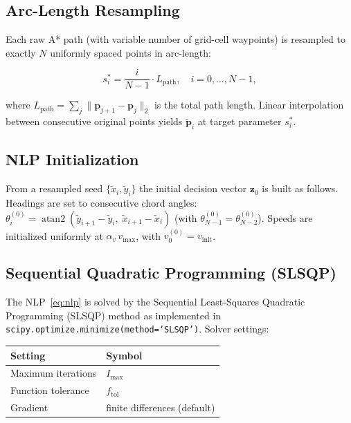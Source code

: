 \documentclass[11pt,a4paper]{article}
\begin{document}
\subsection{Arc-Length Resampling}

Each raw A* path (with variable number of grid-cell waypoints) is resampled to
exactly $N$ uniformly spaced points in arc-length:

\begin{equation}
  s_i^* = \frac{i}{N-1} \cdot L_{\mathrm{path}}, \quad i = 0, \ldots, N-1,
\end{equation}

where $L_{\mathrm{path}} = \sum_j \|\mathbf{p}_{j+1} - \mathbf{p}_j\|_2$ is
the total path length.
Linear interpolation between consecutive original points yields
$\tilde{\mathbf{p}}_i$ at target parameter $s_i^*$.

\subsection{NLP Initialization}

From a resampled seed $\{\tilde{x}_i, \tilde{y}_i\}$ the initial decision
vector $\mathbf{z}_0$ is built as follows.
Headings are set to consecutive chord angles:
$\theta_i^{(0)} = \operatorname{atan2}(\tilde{y}_{i+1} - \tilde{y}_i,\;
                                       \tilde{x}_{i+1} - \tilde{x}_i)$
(with $\theta_{N-1}^{(0)} = \theta_{N-2}^{(0)}$).
Speeds are initialized uniformly at $\alpha_v\,v_{\max}$, with
$v_0^{(0)} = v_{\mathrm{init}}$.

\subsection{Sequential Quadratic Programming (SLSQP)}

The NLP~\eqref{eq:nlp} is solved by the Sequential Least-Squares Quadratic
Programming (SLSQP) method as implemented in
\texttt{scipy.optimize.minimize(method=`SLSQP')}.
Solver settings:

\begin{center}
\begin{tabular}{ll}
\toprule
Setting & Symbol \\
\midrule
Maximum iterations & $I_{\max}$ \\
Function tolerance & $f_{\mathrm{tol}}$ \\
Gradient           & finite differences (default) \\
\bottomrule
\end{tabular}
\end{center}
\end{document}
